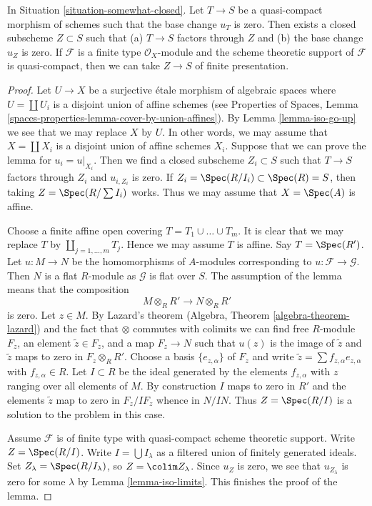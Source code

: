 \begin{lemma}
\label{lemma-F-zero-somewhat-closed}
In Situation \ref{situation-somewhat-closed}. Let $T \to S$
be a quasi-compact morphism of schemes such that the base change $u_T$ is
zero. Then exists a closed subscheme $Z \subset S$ such that
(a) $T \to S$ factors through $Z$ and (b) the base change $u_Z$ is zero.
If $\mathcal{F}$ is a finite type $\mathcal{O}_X$-module and
the scheme theoretic support of $\mathcal{F}$ is quasi-compact,
then we can take $Z \to S$ of finite presentation.
\end{lemma}

\begin{proof}
Let $U \to X$ be a surjective \'etale morphism of algebraic spaces
where $U = \coprod U_i$ is a disjoint union of affine schemes (see
Properties of Spaces, Lemma
\ref{spaces-properties-lemma-cover-by-union-affines}).
By Lemma \ref{lemma-iso-go-up} we see that we may
replace $X$ by $U$. In other words, we may assume that $X = \coprod X_i$
is a disjoint union of affine schemes $X_i$. Suppose that we can prove
the lemma for $u_i = u|_{X_i}$. Then we find a closed subscheme
$Z_i \subset S$ such that $T \to S$ factors through $Z_i$ and
$u_{i, Z_i}$ is zero. If
$Z_i = \Spec(R/I_i) \subset \Spec(R) = S$, then taking
$Z = \Spec(R/\sum I_i)$ works. Thus we may assume that
$X = \Spec(A)$ is affine.

\medskip\noindent
Choose a finite affine open covering $T = T_1 \cup \ldots \cup T_m$.
It is clear that we may replace $T$ by $\coprod_{j = 1, \ldots, m} T_j$.
Hence we may assume $T$ is affine. Say $T = \Spec(R')$.
Let $u : M \to N$ be the homomorphisms of $A$-modules
corresponding to $u : \mathcal{F} \to \mathcal{G}$.
Then $N$ is a flat $R$-module as $\mathcal{G}$ is flat over $S$.
The assumption of the lemma means that the composition
$$
M \otimes_R R' \to N \otimes_R R'
$$
is zero. Let $z \in M$. By Lazard's theorem
(Algebra, Theorem \ref{algebra-theorem-lazard}) and the fact
that $\otimes$ commutes with colimits we can find free $R$-module
$F_z$, an element $\tilde z \in F_z$, and a map $F_z \to N$ such that
$u(z)$ is the image of $\tilde z$ and $\tilde z$ maps to zero in
$F_z \otimes_R R'$. Choose a basis $\{e_{z, \alpha}\}$ of $F_z$ and write
$\tilde z = \sum f_{z, \alpha} e_{z, \alpha}$ with $f_{z, \alpha} \in R$.
Let $I \subset R$ be the ideal generated by the elements $f_{z, \alpha}$
with $z$ ranging over all elements of $M$.
By construction $I$ maps to zero in $R'$ and the elements $\tilde z$
map to zero in $F_z/IF_z$ whence in $N/IN$. Thus $Z = \Spec(R/I)$
is a solution to the problem in this case.

\medskip\noindent
Assume $\mathcal{F}$ is of finite type with quasi-compact scheme
theoretic support. Write $Z = \Spec(R/I)$.
Write $I = \bigcup I_\lambda$ as a filtered union of finitely generated
ideals. Set $Z_\lambda = \Spec(R/I_\lambda)$, so $Z = \colim Z_\lambda$.
Since $u_Z$ is zero, we see that $u_{Z_\lambda}$ is zero
for some $\lambda$ by Lemma \ref{lemma-iso-limits}.
This finishes the proof of the lemma.
\end{proof}

